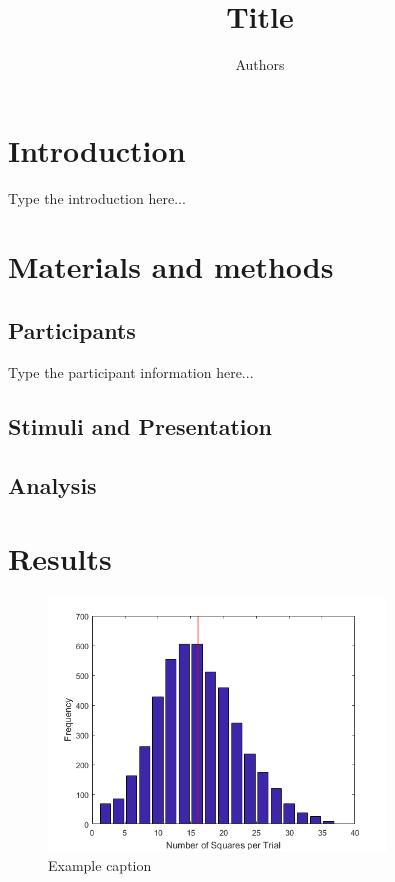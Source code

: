 \documentclass[a4paper,man,floatsintext,12pt]{apa6} %
\title{Title}
\author{Authors}
\affiliation{Affiliation}
\begin{document}
\maketitle
\linenumbers %


\section{Introduction}

Type the introduction here...

\section{Materials and methods} %

\subsection{Participants}

Type the participant information here...

\subsection{Stimuli and Presentation}
\subsection{Analysis}

\section{Results}


\begin{figure}[h!] %
	\centering	
	\includegraphics[width=0.8\textwidth]{exampleImage.png}
	\caption{Example caption}
	\label{fig:exampleImage}	
\end{figure} 
\end{document}
